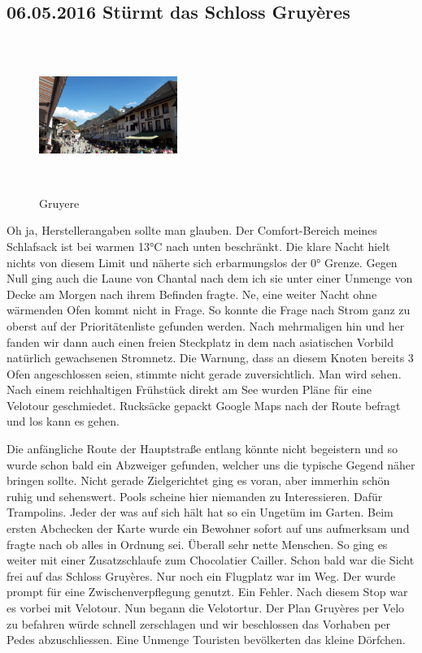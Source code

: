\subsection{06.05.2016 Stürmt das Schloss Gruy\`{e}res}

\begin{figure} 
  \begin{centering}
    \includegraphics[width=0.4\textwidth, height=5cm, keepaspectratio]{../Bilder/Gruyere/10.jpg}
    \caption{Gruyere}
  \end{centering}
\end{figure} 

Oh ja, Herstellerangaben sollte man glauben.
Der Comfort-Bereich meines Schlafsack ist bei warmen 13°C nach unten beschränkt.
Die klare Nacht hielt nichts von diesem Limit und näherte sich erbarmungslos der 0° Grenze.
Gegen Null ging auch die Laune von Chantal nach dem ich sie unter einer Unmenge von Decke am Morgen nach ihrem Befinden fragte.
Ne, eine weiter Nacht ohne wärmenden Ofen kommt nicht in Frage.
So konnte die Frage nach Strom ganz zu oberst auf der Prioritätenliste gefunden werden.
Nach mehrmaligen hin und her fanden wir dann auch einen freien Steckplatz in dem nach asiatischen Vorbild natürlich gewachsenen Stromnetz.
Die Warnung, dass an diesem Knoten bereits 3 Ofen angeschlossen seien, stimmte nicht gerade zuversichtlich.
Man wird sehen.
Nach einem reichhaltigen Frühstück direkt am See wurden Pläne für eine Velotour geschmiedet.
Rucksäcke gepackt Google Maps nach der Route befragt und los kann es gehen.

Die anfängliche Route der Hauptstraße entlang könnte nicht begeistern und so wurde schon bald ein Abzweiger gefunden, welcher uns die typische Gegend näher bringen sollte.
Nicht gerade Zielgerichtet ging es voran, aber immerhin schön ruhig und sehenswert.
Pools scheine hier niemanden zu Interessieren.
Dafür Trampolins.
Jeder der was auf sich hält hat so ein Ungetüm im Garten.
Beim ersten Abchecken der Karte wurde ein Bewohner sofort auf uns aufmerksam und fragte nach ob alles in Ordnung sei.
Überall sehr nette Menschen.
So ging es weiter mit einer Zusatzschlaufe zum Chocolatier Cailler.
Schon bald war die Sicht frei auf das Schloss Gruy\`{e}res.
Nur noch ein Flugplatz war im Weg.
Der wurde prompt für eine Zwischenverpflegung genutzt.
Ein Fehler.
Nach diesem Stop war es vorbei mit Velotour.
Nun begann die Velotortur.
Der Plan Gruy\`{e}res per Velo zu befahren würde schnell zerschlagen und wir beschlossen das Vorhaben per Pedes abzuschliessen.
Eine Unmenge Touristen bevölkerten das kleine Dörfchen.

